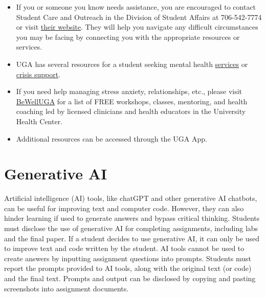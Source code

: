\documentclass[12pt]{article}
\begin{document}
\begin{itemize}
  \setlength\itemsep{-6pt}
  \item If you or someone you know needs assistance, you are
    encouraged to contact Student Care and Outreach in the Division of
    Student Affairs at 706-542-7774 or visit
    \href{https://sco.uga.edu}{their website}. They
    will help you navigate any difficult circumstances you may be facing
    by connecting you with the appropriate resources or services.
  \item UGA has several resources for a student seeking mental health
    \href{https://www.uhs.uga.edu/bewelluga/bewelluga}{services} or
    \href{https://www.uhs.uga.edu/info/emergencies}{crisis support}.
  \item If you need help managing stress anxiety, relationships, etc.,
    please visit \href{https://www.uhs.uga.edu/bewelluga/bewelluga}{BeWellUGA}
    for a list of FREE workshops, classes, mentoring, and health
    coaching led by licensed clinicians and health educators in the
    University Health Center.
  \item Additional resources can be accessed through the UGA App.
\end{itemize}



\vspace{-2mm}
\section*{\normalsize Generative AI}
\vspace{-4mm}

Artificial intelligence (AI) tools, like chatGPT and other generative AI
chatbots, can be useful for improving text and computer code. However,
they can also hinder learning if used to generate answers and bypass
critical thinking. Students must disclose the use of generative AI for
completing assignments, including labs and the final paper. If a
student decides to use generative AI, it can only be used to improve
text and code written by the student. AI tools cannot be used to create
answers by inputting assignment questions into prompts. Students
must report the prompts provided to AI tools, along with the original
text (or code) and the final text. Prompts and output can be disclosed
by copying and pasting screenshots into assignment documents. 
\end{document}
